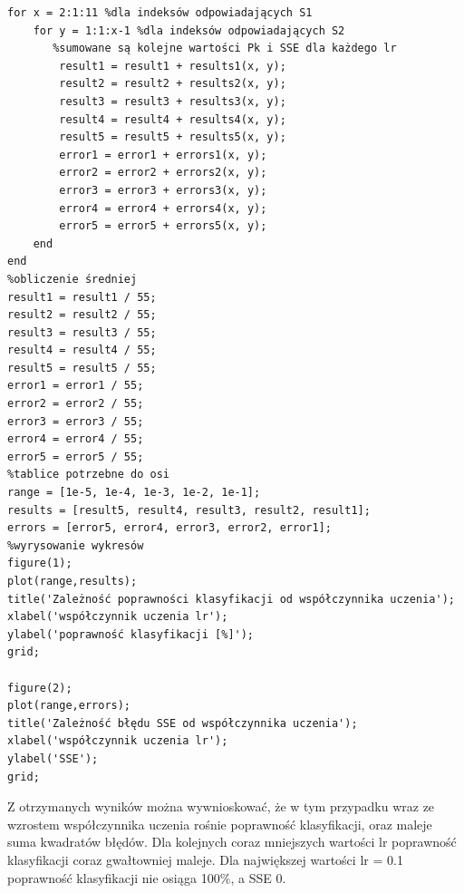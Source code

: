 \documentclass[a4paper, 12pt]{report}
\begin{document}
\begin{lstlisting}[frame=single]
for x = 2:1:11 %dla indeksów odpowiadających S1
    for y = 1:1:x-1	%dla indeksów odpowiadających S2
       %sumowane są kolejne wartości Pk i SSE dla każdego lr
        result1 = result1 + results1(x, y);
        result2 = result2 + results2(x, y);
        result3 = result3 + results3(x, y);
        result4 = result4 + results4(x, y);
        result5 = result5 + results5(x, y);
        error1 = error1 + errors1(x, y);
        error2 = error2 + errors2(x, y);
        error3 = error3 + errors3(x, y);
        error4 = error4 + errors4(x, y);
        error5 = error5 + errors5(x, y);
    end
end
%obliczenie średniej
result1 = result1 / 55;
result2 = result2 / 55;
result3 = result3 / 55;
result4 = result4 / 55;
result5 = result5 / 55;
error1 = error1 / 55;
error2 = error2 / 55;
error3 = error3 / 55;
error4 = error4 / 55;
error5 = error5 / 55;
%tablice potrzebne do osi
range = [1e-5, 1e-4, 1e-3, 1e-2, 1e-1];
results = [result5, result4, result3, result2, result1];
errors = [error5, error4, error3, error2, error1];
%wyrysowanie wykresów
figure(1);
plot(range,results);
title('Zależność poprawności klasyfikacji od współczynnika uczenia');
xlabel('współczynnik uczenia lr');
ylabel('poprawność klasyfikacji [%]');
grid;

figure(2);
plot(range,errors);
title('Zależność błędu SSE od współczynnika uczenia');
xlabel('współczynnik uczenia lr');
ylabel('SSE');
grid;
\end{lstlisting}

Z otrzymanych wyników można wywnioskować, że w tym przypadku wraz ze wzrostem współczynnika uczenia rośnie poprawność klasyfikacji, oraz maleje suma kwadratów błędów. Dla kolejnych coraz mniejszych wartości lr poprawność klasyfikacji coraz gwałtowniej maleje. Dla największej wartości lr = 0.1 poprawność klasyfikacji nie osiąga 100\%, a SSE 0.
\end{document}
